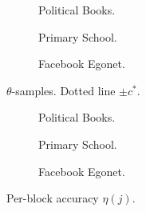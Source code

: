 \begin{figure}[!h]
	\centering
	\begin{subfigure}{0.32\linewidth}
		\centering
		\caption{Political Books.}
		\label{fig:polbooks-null}
	\end{subfigure}
	\begin{subfigure}{0.32\linewidth}
		\centering
		\caption{Primary School.}
		\label{fig:school-null}
	\end{subfigure}
	\begin{subfigure}{0.32\linewidth}
		\centering
		\caption{Facebook Egonet.}
		\label{fig:fb-null}
	\end{subfigure}
	\caption{$\theta$-samples. Dotted line $\pm c^*$.}
\end{figure}

\begin{figure}[!h]
	\centering
	\begin{subfigure}{0.32\linewidth}
		\centering
		\caption{Political Books.}
		\label{fig:polbooks-accuracy}
	\end{subfigure}
	\begin{subfigure}{0.32\linewidth}
		\centering
		\caption{Primary School.}
		\label{fig:school-accuracy}
	\end{subfigure}
	\begin{subfigure}{0.32\linewidth}
		\centering
		\caption{Facebook Egonet.}
		\label{fig:fb-accuracy}
	\end{subfigure}
	\caption{Per-block accuracy $\eta(j)$.}
\end{figure}

